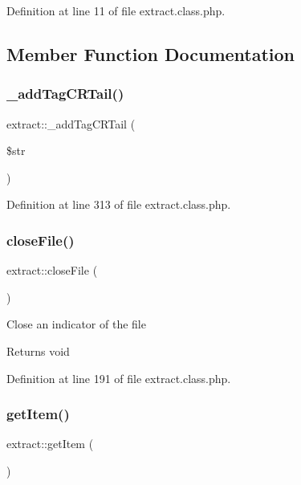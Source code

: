 Definition at line 11 of file extract.\+class.\+php.



\subsection{Member Function Documentation}
\mbox{\label{classextract_a77e98fbf711e5b4e456e1e5316e8132f}} 
\subsubsection{\texorpdfstring{\+\_\+add\+Tag\+C\+R\+Tail()}{\_addTagCRTail()}}
{\footnotesize\ttfamily extract\+::\+\_\+add\+Tag\+C\+R\+Tail (\begin{DoxyParamCaption}\item[{}]{\$str }\end{DoxyParamCaption})}



Definition at line 313 of file extract.\+class.\+php.

\mbox{\label{classextract_a6f2e15680bdecf195711ac7e6663be6f}} 
\subsubsection{\texorpdfstring{close\+File()}{closeFile()}}
{\footnotesize\ttfamily extract\+::close\+File (\begin{DoxyParamCaption}{ }\end{DoxyParamCaption})}

Close an indicator of the file \begin{DoxyReturn}{Returns}
void 
\end{DoxyReturn}


Definition at line 191 of file extract.\+class.\+php.

\mbox{\label{classextract_ab134fd86ba681c1035d3d9961b4d305a}} 
\subsubsection{\texorpdfstring{get\+Item()}{getItem()}}
{\footnotesize\ttfamily extract\+::get\+Item (\begin{DoxyParamCaption}{ }\end{DoxyParamCaption})}

